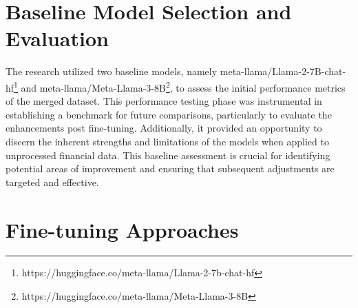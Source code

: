 \documentclass[logo,msc]{infthesis}           %
\begin{document}
\section{Baseline Model Selection and Evaluation}
\begin{comment}
    
\begin{itemize}
    \item Baseline Models Used:
    \begin{itemize}
        \item meta-llama/Llama-2-7b-chat-hf \footnote{https://huggingface.co/meta-llama/Llama-2-7b-chat-hf}
        \item meta-llama/Meta-Llama-3-8B \footnote{https://huggingface.co/meta-llama/Meta-Llama-3-8B}
    \end{itemize}
    \item Performance Testing: The merged dataset was tested on these baseline models to establish initial performance metrics. This step was crucial for:
    \begin{itemize}
        \item Benchmarking: Establishing a reference point for comparing improvements post fine-tuning.
        \item Identifying Weaknesses: Understanding the initial strengths and weaknesses of the models with raw financial data.
    \end{itemize}
\end{itemize}
\end{comment}
The research utilized two baseline models, namely meta-llama/Llama-2-7B-chat-hf\footnote{https://huggingface.co/meta-llama/Llama-2-7b-chat-hf} and meta-llama/Meta-Llama-3-8B\footnote{https://huggingface.co/meta-llama/Meta-Llama-3-8B}, to assess the initial performance metrics of the merged dataset. This performance testing phase was instrumental in establishing a benchmark for future comparisons, particularly to evaluate the enhancements post fine-tuning. Additionally, it provided an opportunity to discern the inherent strengths and limitations of the models when applied to unprocessed financial data. This baseline assessment is crucial for identifying potential areas of improvement and ensuring that subsequent adjustments are targeted and effective.
\section{Fine-tuning Approaches}
\label{Fine-tuning Approaches}
\end{document}

